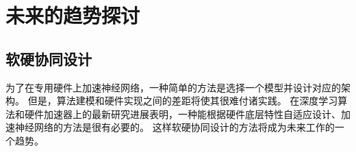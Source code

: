 \section{未来的趋势探讨}
\subsection{软硬协同设计}
为了在专用硬件上加速神经网络，一种简单的方法是选择一个模型并设计对应的架构。
但是，算法建模和硬件实现之间的差距将使其很难付诸实践。
在深度学习算法和硬件加速器上的最新研究进展表明，一种能根据硬件底层特性自适应设计、加速神经网络的方法是很有必要的。
这样软硬协同设计的方法将成为未来工作的一个趋势。
